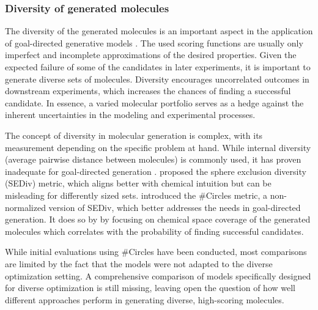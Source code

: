 
\subsubsection{Diversity of generated molecules}
The diversity of the generated molecules is an important aspect in the application of goal-directed
generative models
\citep{martinDiverseViewpointsComputational2001,gorseDiversityMedicinalChemistry2006}. The used
scoring functions are usually only imperfect and incomplete approximations of the desired
properties. Given the expected failure of some of the candidates in later experiments, it is
important to generate diverse sets of molecules. Diversity encourages uncorrelated outcomes in
downstream experiments, which increases the chances of finding a successful candidate. In essence, a
varied molecular portfolio serves as a hedge against the inherent uncertainties in the modeling and
experimental processes.

The concept of diversity in molecular generation is complex, with its measurement depending on the
specific problem at hand. While internal diversity (average pairwise distance between molecules) is
commonly used, it has proven inadequate for goal-directed generation
\citep{waldmanNovelAlgorithmsOptimization2000,xieMARSMarkovMolecular2021,thomasComparisonStructureLigandbased2021}.
\citet{thomasComparisonStructureLigandbased2021} proposed the sphere exclusion diversity (SEDiv)
metric, which aligns better with chemical intuition but can be misleading for differently sized
sets. \citet{xieHowMuchSpace2023} introduced the \#Circles metric, a non-normalized version of SEDiv,
which better addresses the needs in goal-directed generation. It does so by
by focusing on chemical space coverage of the generated molecules which correlates with
the probability of finding successful candidates.

While initial evaluations using \#Circles have been conducted, most comparisons are limited by the
fact that the models were not adapted to the diverse optimization setting. A comprehensive
comparison of models specifically designed for diverse optimization is still missing, leaving open
the question of how well different approaches perform in generating diverse, high-scoring molecules.

